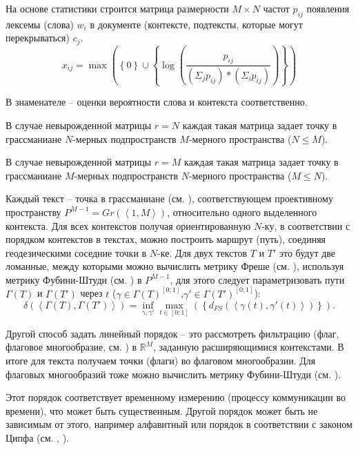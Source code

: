 На основе статистики строится матрица размерности $M\times{N}$ частот $p_{ij}$ появления лексемы (слова) $w_{i}$ в документе (контексте, подтексты, которые могут перекрываться) $c_{j}$.
$$
x_{ij}=\max{\left( \left\lbrace 0\right\rbrace \cup \left\lbrace \log{\left(\frac{p_{ij}}{\left( \Sigma_{j} p_{ij}\right) *\left( \Sigma_{i} p_{ij}\right) } \right) }\right\rbrace \right) }
$$

В знаменателе -- оценки вероятности слова и контекста соответственно.

В случае невырожденной матрицы $r=N$ каждая такая матрица задает точку в грассманиане $N$-мерных подпространств $M$-мерного пространства ($N\leq{M}$).

В случае невырожденной матрицы $r=M$ каждая такая матрица задает точку в грассманиане $M$-мерных подпространств $N$-мерного пространства ($M\leq{N}$).

Каждый текст -- точка в грассманиане (см. ), соответствующем проективному пространству $P^{M-1}=Gr\left( \left\langle1,M \right\rangle \right)$, относительно одного выделенного контекста. Для всех контекстов получая ориентированную $N$-ку, в соответствии с порядком контекстов в текстах, можно построить маршрут (путь), соединяя геодезическими соседние точки в $N$-ке. Для двух текстов $T$ и $T'$ это будут две ломанные, между которыми можно вычислить метрику Фреше (см. ), используя метрику Фубини-Штуди (см. ) в $P^{M-1}$, для этого следует параметризовать пути $\Gamma\left( T \right)$ и $\Gamma\left( T' \right)$ через $t$ ($\gamma\in\Gamma\left( T \right)^{\left[ 0;1\right] }$,$\gamma' \in\Gamma\left( T'\right)^{\left[ 0;1\right] }$): 
$$
\delta\left( \left\langle \Gamma\left( T \right),\Gamma\left( T'\right)\right\rangle \right) =\inf_{\gamma,\gamma'}\max_{t\in\left[ 0;1\right] }\left(  \left\lbrace d_{FS}\left( \left\langle \gamma\left( t\right) ,\gamma'\left( t\right) \right\rangle \right) \right\rbrace \right).
$$

Другой способ задать линейный порядок -- это рассмотреть фильтрацию (флаг, флаговое многообразие, см. ) в $\mathbb{R}^{M}$, заданную расширяющимися контекстами. В итоге для текста получаем точки (флаги) во флаговом многообразии. Для флаговых многообразий тоже можно вычислить метрику Фубини-Штуди (см. ).

Этот порядок соответствует временному измерению (процессу коммуникации во времени), что может быть существенным. Другой порядок может быть не зависимым от этого, например алфавитный или порядок в соответствии с законом Ципфа (см. , ). 

